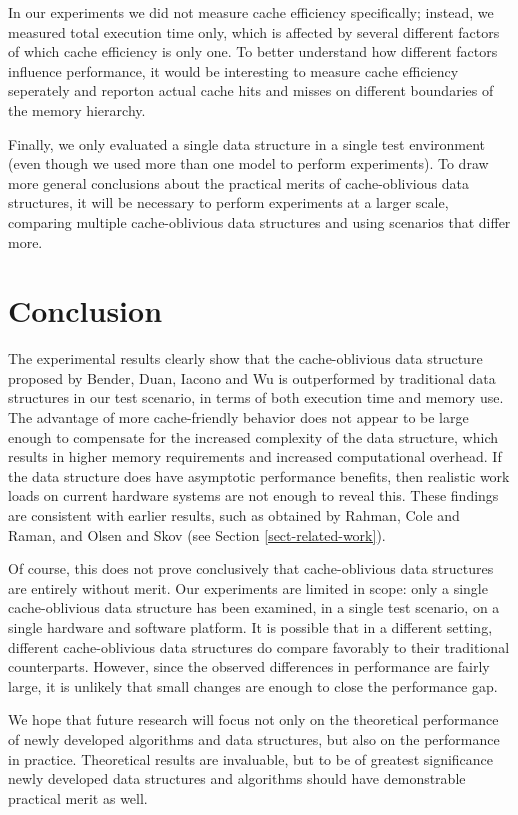 \documentclass{acm_proc_article-sp}
\begin{document}
In our experiments we did not measure cache efficiency specifically; instead,
we measured total execution time only, which is affected by several different
factors of which cache efficiency is only one.
To better understand how different factors influence performance, it would
be interesting to measure cache efficiency seperately and reporton actual
cache hits and misses on different boundaries of the memory hierarchy.

Finally, we only evaluated a single data structure in a single test
environment (even though we used more than one model to perform experiments).
To draw more general conclusions about the practical merits of cache-oblivious
data structures, it will be necessary to perform experiments at a larger scale,
comparing multiple cache-oblivious data structures and using scenarios that
differ more.

\section{Conclusion}
The experimental results clearly show that the cache-oblivious data structure
proposed by Bender, Duan, Iacono and Wu is outperformed by traditional data
structures in our test scenario, in terms of both execution time and memory use.
The advantage of more cache-friendly behavior does not appear to be large enough
to compensate for the increased complexity of the data structure, which results in
higher memory requirements and increased computational overhead.
If the data structure does have asymptotic performance benefits, then realistic
work loads on current hardware systems are not enough to reveal this.
These findings are consistent with earlier results, such as obtained by
Rahman, Cole and Raman, and Olsen and Skov (see Section \ref{sect-related-work}).

Of course, this does not prove conclusively that cache-oblivious data structures
are entirely without merit. Our experiments are limited in scope: only a single
cache-oblivious data structure has been examined, in a single test scenario,
on a single hardware
and software platform.
It is possible that in a different setting, different cache-oblivious data
structures do compare favorably to their traditional counterparts.
However, since the observed differences in performance are fairly large,
it is unlikely that small changes are enough to close the performance gap.

We hope that future research will focus not only on the theoretical performance
of newly developed algorithms and data structures, but also on the performance
in practice. Theoretical results are invaluable, but to be of greatest
significance newly developed data structures and algorithms should have
demonstrable practical merit as well.
\end{document}
